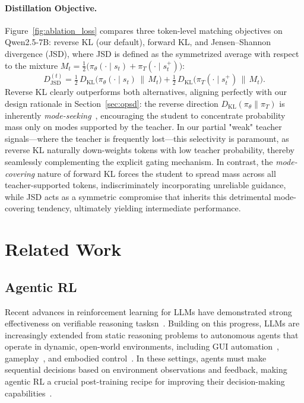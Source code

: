 \documentclass{llmxive}
\begin{document}
\paragraph{Distillation Objective.} Figure~\ref{fig:ablation_loss} compares three token-level matching objectives on Qwen2.5-7B: reverse KL (our default), forward KL, and Jensen--Shannon divergence (JSD), where JSD is defined as the symmetrized average with respect to the mixture $M_t = \tfrac{1}{2}\bigl(\pi_{\theta}(\cdot\mid s_t) + \pi_T(\cdot\mid s_t^{+})\bigr)$: $$ D_{\mathrm{JSD}}^{(t)} = \tfrac{1}{2}\,D_{\mathrm{KL}}\!\bigl(\pi_{\theta}(\cdot\mid s_t)\,\|\,M_t\bigr) + \tfrac{1}{2}\,D_{\mathrm{KL}}\!\bigl(\pi_T(\cdot\mid s_t^{+})\,\|\,M_t\bigr). $$ Reverse KL clearly outperforms both alternatives, aligning perfectly with our design rationale in Section~\ref{sec:opsd}: the reverse direction $D_{\mathrm{KL}}(\pi_{\theta}\|\pi_T)$ is inherently \emph{mode-seeking}~\citep{murphy2012machine}, encouraging the student to concentrate probability mass only on modes supported by the teacher. In our partial "weak" teacher signals---where the teacher is frequently lost---this selectivity is paramount, as reverse KL naturally down-weights tokens with low teacher probability, thereby seamlessly complementing the explicit gating mechanism. In contrast, the \emph{mode-covering} nature of forward KL forces the student to spread mass across all teacher-supported tokens, indiscriminately incorporating unreliable guidance, while JSD acts as a symmetric compromise that inherits this detrimental mode-covering tendency, ultimately yielding intermediate performance.

\section{Related Work}

\subsection{Agentic RL}

Recent advances in reinforcement learning for LLMs have demonstrated strong effectiveness on verifiable reasoning tasksn~\citep{shao2024deepseekmath,yu2025dapo,guo2025ds-r1,yao2026coba,chen2026learning}. 
Building on this progress, LLMs are increasingly extended from static reasoning problems to autonomous agents that operate in dynamic, open-world environments, including GUI automation~\citep{ye2025mobileagentv3}, gameplay~\citep{shridhar2020alfworld}, and embodied control~\citep{wang2023voyager}. 
In these settings, agents must make sequential decisions based on environment observations and feedback, making agentic RL a crucial post-training recipe for improving their decision-making capabilities~\citep{lu2025uis1,dong2025arpo,feng2025gigpo,lu2026uir1,lu2026uicopilot,shi2026skill1}.
\end{document}
